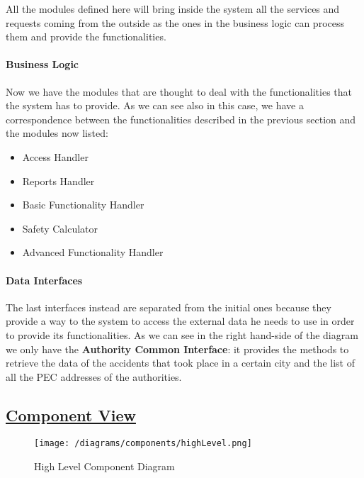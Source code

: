 			All the modules defined here will bring inside the system all the services and requests coming from the outside as the ones in the business logic can process them and provide the functionalities.
			
			\paragraph{Business Logic} Now we have the modules that are thought to deal with the functionalities that the system has to provide. As we can see also in this case, we have a correspondence between the functionalities described in the previous section and the modules now listed:
			
			\begin{itemize}
				\item Access Handler
				\item Reports Handler
				\item Basic Functionality Handler
				\item Safety Calculator
				\item Advanced Functionality Handler
			\end{itemize}
		
			\paragraph{Data Interfaces} The last interfaces instead are separated from the initial ones because they provide a way to the system to access the external data he needs to use in order to provide its functionalities. As we can see in the right hand-side of the diagram we only have the \textbf{Authority Common Interface}: it provides the methods to retrieve the data of the accidents that took place in a certain city and the list of all the PEC addresses of the authorities.
		
	\subsection[Component View]{\hyperlink{toc}{Component View}}
		\label{sec:componentView}
		
		\begin{figure}[ht]
			\centering
			\texttt{[image: /diagrams/components/highLevel.png]}
			\caption{\label{fig:highLevelComp} High Level Component Diagram}
		\end{figure}
	

